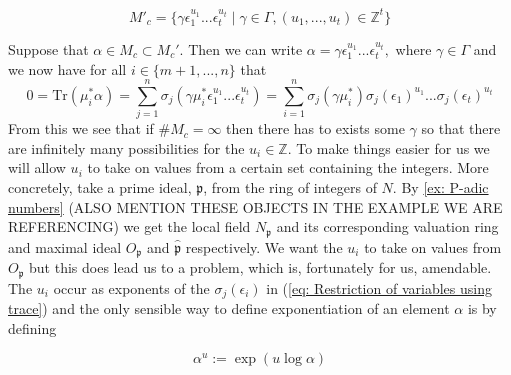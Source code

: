 \documentclass{article}
\newcommand{\mfrak}[1]{\mathfrak{#1}}
\newcommand{\mbb}[1]{\mathbb{#1}}
\newcommand{\tr}{\text{Tr}}
\begin{document}
\begin{equation*}\tag{$\star$}\label{eq: Form of Mc}
    M'_c = \{\gamma \epsilon_1^{u_1}...\epsilon_t^{u_t} \mid \gamma \in \Gamma, (u_1,...,u_t)\in \mbb Z^t\}
\end{equation*}

Suppose that $\alpha \in M_c \subset M_c'$. Then we can write $\alpha = \gamma \epsilon_1^{u_1}...\epsilon_t^{u_t},$
where $\gamma \in \Gamma$ and we now have for all $i \in \{m+1, ..., n\}$ that 
\begin{equation}\label{eq: Restriction of variables using trace}\tag{\textdagger \textdagger}
    0 = \tr(\mu_{i}^* \alpha) = \sum_{j = 1}^n \sigma_j(\gamma \mu_i^* \epsilon_1^{u_1}...\epsilon_t^{u_t}) = \sum_{i = 1}^n \sigma_j(\gamma \mu_i^* ) \sigma_j(\epsilon_1)^{u_1}...\sigma_j(\epsilon_t)^{u_t}
\end{equation}
From this we see that if $\# M_c = \infty$ then there has to exists some $\gamma$ so that there are infinitely many possibilities for the $u_i \in \mbb Z$. To make things easier for us we will allow $u_i$ to take on values from a certain set containing the integers. More concretely, take a prime ideal, $\mfrak p$, from the ring of integers of $N$. By \ref{ex: P-adic numbers} (ALSO MENTION THESE OBJECTS IN THE EXAMPLE WE ARE REFERENCING) we get the local field $N_{\mfrak p}$ and its corresponding valuation ring and maximal ideal $O_{\mfrak p}$ and $\hat {\mfrak p}$ respectively. We want the $u_i$ to take on values from $O_{\mfrak p}$ but this does lead us to a problem, which is, fortunately for us, amendable. The $u_i$ occur as exponents of the $\sigma_j(\epsilon_i)$ in (\ref{eq: Restriction of variables using trace}) and the only sensible way to define exponentiation of an element $\alpha$ is by defining 

\begin{equation}\tag{$\star\star$}\label{eq: Exponential function}
    \alpha^u := \exp(u \log \alpha)
\end{equation}
\end{document}
